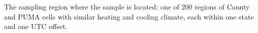 The sampling region where the sample is located: one of 200 regions of County and PUMA cells with similar heating and cooling climate, each within one state and one UTC offset.
